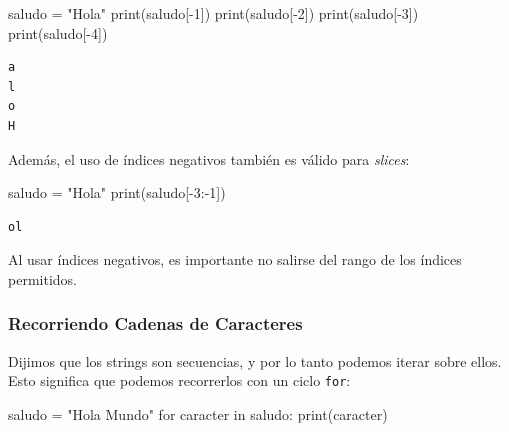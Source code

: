 \documentclass[
  letterpaper,
  DIV=11,
  numbers=noendperiod]{scrreprt}
\newenvironment{Shaded}{\begin{snugshade}}{\end{snugshade}}
\newcommand{\BuiltInTok}[1]{\textcolor[rgb]{0.00,0.23,0.31}{#1}}
\newcommand{\ControlFlowTok}[1]{\textcolor[rgb]{0.00,0.23,0.31}{#1}}
\newcommand{\DecValTok}[1]{\textcolor[rgb]{0.68,0.00,0.00}{#1}}
\newcommand{\KeywordTok}[1]{\textcolor[rgb]{0.00,0.23,0.31}{#1}}
\newcommand{\NormalTok}[1]{\textcolor[rgb]{0.00,0.23,0.31}{#1}}
\newcommand{\OperatorTok}[1]{\textcolor[rgb]{0.37,0.37,0.37}{#1}}
\newcommand{\StringTok}[1]{\textcolor[rgb]{0.13,0.47,0.30}{#1}}
\begin{document}
\begin{tcolorbox}
\begin{Shaded}
\begin{Highlighting}[]
\NormalTok{saludo }\OperatorTok{=} \StringTok{"Hola"}
\BuiltInTok{print}\NormalTok{(saludo[}\OperatorTok{{-}}\DecValTok{1}\NormalTok{])}
\BuiltInTok{print}\NormalTok{(saludo[}\OperatorTok{{-}}\DecValTok{2}\NormalTok{])}
\BuiltInTok{print}\NormalTok{(saludo[}\OperatorTok{{-}}\DecValTok{3}\NormalTok{])}
\BuiltInTok{print}\NormalTok{(saludo[}\OperatorTok{{-}}\DecValTok{4}\NormalTok{])}
\end{Highlighting}
\end{Shaded}

\begin{verbatim}
a
l
o
H
\end{verbatim}

Además, el uso de índices negativos también es válido para
\emph{slices}:

\begin{Shaded}
\begin{Highlighting}[]
\NormalTok{saludo }\OperatorTok{=} \StringTok{"Hola"}
\BuiltInTok{print}\NormalTok{(saludo[}\OperatorTok{{-}}\DecValTok{3}\NormalTok{:}\OperatorTok{{-}}\DecValTok{1}\NormalTok{])}
\end{Highlighting}
\end{Shaded}

\begin{verbatim}
ol
\end{verbatim}

Al usar índices negativos, es importante no salirse del rango de los
índices permitidos.

\end{tcolorbox}

\hypertarget{recorriendo-cadenas-de-caracteres}{%
\subsubsection{Recorriendo Cadenas de
Caracteres}\label{recorriendo-cadenas-de-caracteres}}

Dijimos que los strings son secuencias, y por lo tanto podemos iterar
sobre ellos. Esto significa que podemos recorrerlos con un ciclo
\texttt{for}:

\begin{Shaded}
\begin{Highlighting}[]
\NormalTok{saludo }\OperatorTok{=} \StringTok{"Hola Mundo"}
\ControlFlowTok{for}\NormalTok{ caracter }\KeywordTok{in}\NormalTok{ saludo:}
    \BuiltInTok{print}\NormalTok{(caracter)}
\end{Highlighting}
\end{Shaded}
\end{document}

